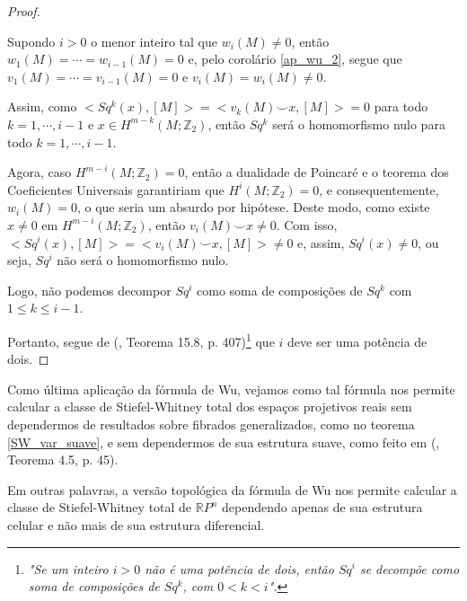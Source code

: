 \documentclass[12pt,oneside]{book} %
\newcommand{\RP}{\mathbb{R}P}
\newcommand{\Z}{\mathbb{Z}}
\newcommand{\ccup}{\smile}
\begin{document}
\begin{proof}
	
	\
	
	\par Supondo $i>0$ o menor inteiro tal que $w_{i}(M)\neq 0$, então $w_{1}(M)=\cdots=w_{i-1}(M)=0$ e, pelo corolário \ref{ap_wu_2}, segue que $v_{1}(M)=\cdots=v_{i-1}(M)=0$ e $v_{i}(M)=w_{i}(M)\neq 0$.
	
	\par Assim, como $<Sq^{k}(x),[M]>=<v_{k}(M)\ccup x,[M]>=0$ para todo $k=1,\cdots,i-1$ e $x\in H^{m-k}(M;\Z_{2})$, então $Sq^{k}$ será o homomorfismo nulo para todo $k=1,\cdots,i-1$.
	
	\par Agora, caso $H^{m-i}(M;\Z_{2})=0$, então a dualidade de Poincaré e o teorema dos Coeficientes Universais garantiriam que $H^{i}(M;\Z_{2})=0$, e consequentemente, $w_{i}(M)=0$, o que seria um absurdo por hipótese. Deste modo, como existe $x\neq 0$ em $H^{m-i}(M;\Z_{2})$, então $v_{i}(M)\ccup x\neq 0$. Com isso, $<Sq^{i}(x),[M]>=<v_{i}(M)\ccup x,[M]>\neq 0$ e, assim, $Sq^{i}(x)\neq 0$, ou seja, $Sq^{i}$ não será o homomorfismo nulo.
	
	\par Logo, não podemos decompor $Sq^{i}$ como soma de composições de $Sq^{k}$ com $1\leq k\leq i-1$.
	
	\par Portanto, segue de (\cite{bredon}, Teorema 15.8, p. 407)\footnote{\textit{"Se um inteiro $i>0$ não é uma potência de dois, então $Sq^{i}$ se decompõe como soma de composições de $Sq^{k}$, com $0<k<i$".}} que $i$ deve ser uma potência de dois.
	
\end{proof}

\par Como última aplicação da fórmula de Wu, vejamos como tal fórmula nos permite calcular a classe de Stiefel-Whitney total dos espaços projetivos reais sem dependermos de resultados sobre fibrados generalizados, como no teorema \ref{SW_var_suave}, e sem dependermos de sua estrutura suave, como feito em (\cite{milnor_1}, Teorema 4.5, p. 45).

\par Em outras palavras, a versão topológica da fórmula de Wu nos permite calcular a classe de Stiefel-Whitney total de $\RP^{n}$ dependendo apenas de sua estrutura celular e não mais de sua estrutura diferencial.
\end{document}
